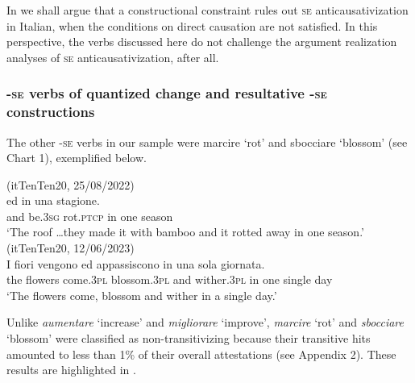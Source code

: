 \documentclass[output=paper,colorlinks,citecolor=brown
]{langscibook}
\begin{document}
In  we shall argue that a constructional constraint rules out \textsc{se} anticausativization in Italian, when the conditions on direct causation are not satisfied. In this perspective, the verbs discussed here do not challenge the argument realization analyses of \textsc{se} anticausativization, after all.

\subsubsection{-\textsc{se} verbs of quantized change and resultative -\textsc{se} constructions}
\label{bentley_section_3.3.2}

The other -\textsc{se} verbs in our sample were marcire ‘rot’ and sbocciare ‘blossom’ (see Chart 1), exemplified below.

\ea (itTenTen20, 25/08/2022)\\\label{bentley_example_14}
    ed		 						in	una	stagione.  \\
 {} 				and	be.3\textsc{sg}	rot.\textsc{ptcp}		in	one	season \\
    \glt 			‘The roof  \ldots  they made it with bamboo and it rotted away in one season.’
\ex (itTenTen20, 12/06/2023)\label{bentley_example_15}\\
    \gll I			fiori				vengono						ed		appassiscono	in 	una sola			giornata. \\
 the	flowers	come.3\textsc{pl}		blossom.3\textsc{pl}	and	wither.3\textsc{pl}				in		one	single	day \\
    \glt 				‘The flowers come, blossom and wither in a single day.’
\z

Unlike \textit{aumentare} ‘increase’ and \textit{migliorare} ‘improve’, \textit{marcire} ‘rot’ and \textit{sbocciare} ‘blossom’ were classified as non-transitivizing because their transitive hits amounted to less than 1\% of their overall attestations (see Appendix 2). These results are highlighted in .
\end{document}
